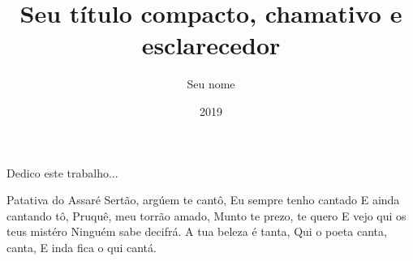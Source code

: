 \documentclass[pt,twoside,onehalfspacing,bsc]{risethesis}
\title{Seu título compacto, chamativo e esclarecedor}
\date{2019}
\author{Seu nome}
\begin{document}
\frontmatter

\frontpage

\presentationpage

\begin{fichacatalografica}
	\FakeFichaCatalografica
\end{fichacatalografica}

\banca

\begin{dedicatory}
Dedico este trabalho...
\end{dedicatory}

\acknowledgements


\begin{epigraph}[]{Patativa do Assaré}
Sertão, argúem te cantô,
Eu sempre tenho cantado
E ainda cantando tô,
Pruquê, meu torrão amado,
Munto te prezo, te quero
E vejo qui os teus mistéro
Ninguém sabe decifrá.
A tua beleza é tanta,
Qui o poeta canta, canta,
E inda fica o qui cantá.
\end{epigraph}

\resumo
{\parindent0pt
	
}

\abstract
{\parindent0pt
	
}

\listoffigures

\listoftables

\listofacronyms


\tableofcontents

\mainmatter







\begin{references}
  
\end{references}


\theappendix

\end{document}
